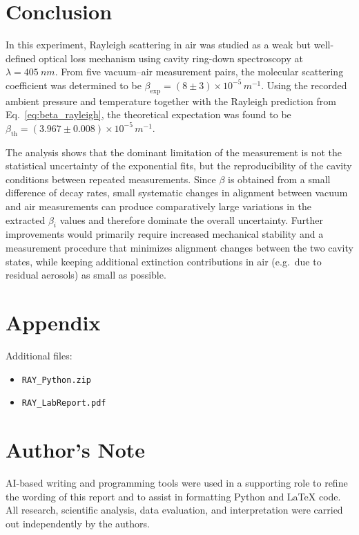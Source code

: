 \documentclass[a4paper]{article}
\begin{document}
\section{Conclusion}
\label{sec:conclusion}

In this experiment, Rayleigh scattering in air was studied as a weak but well-defined optical loss mechanism using cavity ring-down spectroscopy at $\lambda=\SI{405}{nm}$.
From five vacuum--air measurement pairs, the molecular scattering coefficient was determined to be $\beta_\mathrm{exp}=(8\pm 3)\times 10^{-5}\,\si{m^{-1}}$.
Using the recorded ambient pressure and temperature together with the Rayleigh prediction from Eq.~\eqref{eq:beta_rayleigh}, the theoretical expectation was found to be $\beta_\mathrm{th}=(3.967\pm 0.008)\times 10^{-5}\,\si{m^{-1}}$.

The analysis shows that the dominant limitation of the measurement is not the statistical uncertainty of the exponential fits, but the reproducibility of the cavity conditions between repeated measurements.
Since $\beta$ is obtained from a small difference of decay rates, small systematic changes in alignment between vacuum and air measurements can produce comparatively large variations in the extracted $\beta_i$ values and therefore dominate the overall uncertainty.
Further improvements would primarily require increased mechanical stability and a measurement procedure that minimizes alignment changes between the two cavity states, while keeping additional extinction contributions in air (e.g.\ due to residual aerosols) as small as possible.

\newpage
\section{Appendix}

Additional files:

\begin{itemize}
  \item \texttt{RAY\_Python.zip}
  \item \texttt{RAY\_LabReport.pdf}
\end{itemize}

\printbibliography[heading=bibintoc]

\section*{Author's Note}
AI-based writing and programming tools were used in a supporting role to refine the wording of this report and to assist in formatting Python and LaTeX code.
All research, scientific analysis, data evaluation, and interpretation were carried out independently by the authors.

\newpage

\end{document}
